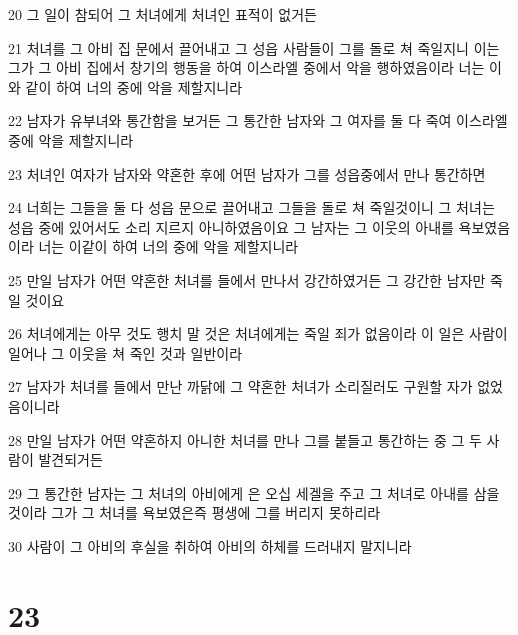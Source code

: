 \par 20 그 일이 참되어 그 처녀에게 처녀인 표적이 없거든
\par 21 처녀를 그 아비 집 문에서 끌어내고 그 성읍 사람들이 그를 돌로 쳐 죽일지니 이는 그가 그 아비 집에서 창기의 행동을 하여 이스라엘 중에서 악을 행하였음이라 너는 이와 같이 하여 너의 중에 악을 제할지니라
\par 22 남자가 유부녀와 통간함을 보거든 그 통간한 남자와 그 여자를 둘 다 죽여 이스라엘 중에 악을 제할지니라
\par 23 처녀인 여자가 남자와 약혼한 후에 어떤 남자가 그를 성읍중에서 만나 통간하면
\par 24 너희는 그들을 둘 다 성읍 문으로 끌어내고 그들을 돌로 쳐 죽일것이니 그 처녀는 성읍 중에 있어서도 소리 지르지 아니하였음이요 그 남자는 그 이웃의 아내를 욕보였음이라 너는 이같이 하여 너의 중에 악을 제할지니라
\par 25 만일 남자가 어떤 약혼한 처녀를 들에서 만나서 강간하였거든 그 강간한 남자만 죽일 것이요
\par 26 처녀에게는 아무 것도 행치 말 것은 처녀에게는 죽일 죄가 없음이라 이 일은 사람이 일어나 그 이웃을 쳐 죽인 것과 일반이라
\par 27 남자가 처녀를 들에서 만난 까닭에 그 약혼한 처녀가 소리질러도 구원할 자가 없었음이니라
\par 28 만일 남자가 어떤 약혼하지 아니한 처녀를 만나 그를 붙들고 통간하는 중 그 두 사람이 발견되거든
\par 29 그 통간한 남자는 그 처녀의 아비에게 은 오십 세겔을 주고 그 처녀로 아내를 삼을 것이라 그가 그 처녀를 욕보였은즉 평생에 그를 버리지 못하리라
\par 30 사람이 그 아비의 후실을 취하여 아비의 하체를 드러내지 말지니라

\chapter{23}

